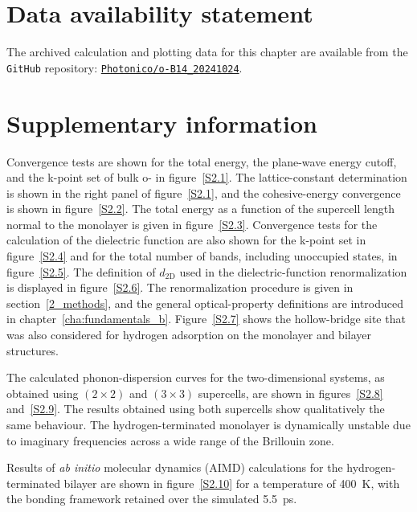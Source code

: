 \clearpage
\section{Data availability statement}

The archived calculation and plotting data for this chapter are available from the \texttt{GitHub} repository:
\href{https://github.com/Photonico/o-B14_20241024}{\texttt{Photonico/o-B14\_20241024}}.

\FloatBarrier
\section{Supplementary information}
\label{2_supplementary}

Convergence tests are shown for the total energy, the plane-wave energy cutoff,
and the k-point set of bulk o- in figure~\ref{S2.1}.
The lattice-constant determination is shown in the right panel of figure~\ref{S2.1},
and the cohesive-energy convergence is shown in figure~\ref{S2.2}.
The total energy as a function of the supercell length normal to the monolayer is given in figure~\ref{S2.3}.
Convergence tests for the calculation of the dielectric function are also shown for the k-point set in figure~\ref{S2.4}
and for the total number of bands, including unoccupied states, in figure~\ref{S2.5}.
The definition of $d_{\mathrm{2D}}$ used in the dielectric-function renormalization is displayed in figure~\ref{S2.6}.
The renormalization procedure is given in section~\ref{2_methods},
and the general optical-property definitions are introduced in chapter~\ref{cha:fundamentals_b}.
Figure~\ref{S2.7} shows the hollow-bridge site that was also considered for hydrogen adsorption on the monolayer and bilayer structures.

The calculated phonon-dispersion curves for the two-dimensional systems,
as obtained using $(2 \times 2)$ and $(3 \times 3)$ supercells, are shown in figures~\ref{S2.8} and~\ref{S2.9}.
The results obtained using both supercells show qualitatively the same behaviour.
The hydrogen-terminated monolayer is dynamically unstable due to imaginary frequencies across a wide range of the Brillouin zone.

Results of \textit{ab initio} molecular dynamics (AIMD) calculations for the hydrogen-terminated bilayer are shown in figure~\ref{S2.10} for a temperature of \qty{400}{K}, with the bonding framework retained over the simulated \qty{5.5}{ps}.

